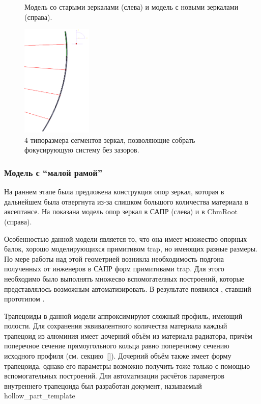 \begin{figure}[H]
\begin{minipage}[b]{0.495\textwidth}
\end{minipage}
\caption{Модель со старыми зеркалами (слева) и модель с новыми зеркалами (справа).}
\label{fig:MCgeoMirrorsEvolution}
\end{figure}

\begin{figure}[H]
\centering
\includegraphics[width=0.3\textwidth]{pictures/Mirrors_4types_of_segments.png}
\caption{4 типоразмера сегментов зеркал, позволяющие собрать фокусирующую систему без зазоров.}
\label{fig:Mirrors4types}
\end{figure}

\subsubsection{Модель с ``малой рамой''}\label{sec:secModelWithSmallFrame}

На раннем этапе была предложена конструкция опор зеркал, которая в дальнейшем была отвергнута из-за слишком большого количества материала в аксептансе. На  показана модель опор зеркал в САПР (слева) и в CbmRoot (справа).

Особенностью данной модели является то, что она имеет множество опорных балок, хорошо моделирующихся примитивом trap, но имеющих разные размеры.
По мере работы над этой геометрией возникла необходимость подгона полученных от инженеров в САПР форм примитивами trap.
Для этого необходимо было выполнять множесво вспомогателных построений, которые представлялось возможным автоматизировать.
В результате появился , ставший прототипом .

Трапецоиды в данной модели аппроксимируют сложный профиль, имеющий полости. Для сохранения эквивалентного количества материала каждый трапецоид из алюминия имеет дочерний объём из материала радиатора, причём поперечное сечение прямоугольного кольца равно поперечному сечению исходного профиля (см. секцию~\ref{}). Дочерний объём также имеет форму трапецоида, однако его параметры возможно получить тоже только с помощью вспомогательных построений. Для автоматизации расчётов параметров внутреннего трапецоида был разработан документ, называемый hollow_part_template

